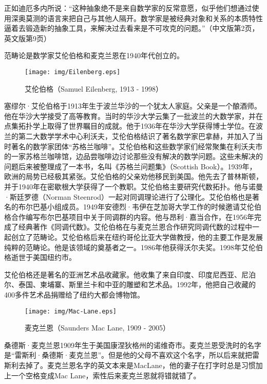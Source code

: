 \documentclass{article}
\begin{document}
正如迪厄多内所说：“这种抽象绝不是来自数学家的反常意愿，似乎他们想通过使用深奥莫测的语言来把自己与其他人隔开。数学家是被经典对象和关系的本质特性逼着去锻造新的抽象工具，来解决过去看来是不可攻克的问题。”\cite{Dieudonne1987}（中文版第2页，英文版第9页）

范畴论是数学家艾伦伯格和麦克兰恩在1940年代创立的。

\begin{wrapfigure}{R}{0.3\textwidth}
 \centering
 \texttt{[image: img/Eilenberg.eps]}
 \captionsetup{labelformat=empty}
 \caption{艾伦伯格（Samuel Eilenberg, 1913 - 1998）}
 \label{fig:Eilenberg}
\end{wrapfigure}

塞缪尔·艾伦伯格于1913年生于波兰华沙的一个犹太人家庭。父亲是一个酿酒师。他在华沙大学接受了高等教育。当时的华沙大学云集了一批波兰的大数学家，并在点集拓扑学上取得了世界瞩目的成就。他于1936年在华沙大学获得博士学位。在波兰的第二大数学学术中心利沃夫，艾伦伯格结识了著名数学家巴拿赫，并加入了当时著名的数学家团体“苏格兰咖啡”。艾伦伯格和这些数学家们经常聚集在利沃夫市的一家苏格兰咖啡馆，边品尝咖啡边讨论那些没有解决的数学问题。这些未解决的问题后来被整理成了一本书，名叫《苏格兰问题集》（Scottish Book）。1939年，欧洲的局势已经极其紧张。艾伦伯格的父亲劝他移民到美国。他先去了普林斯顿，并于1940年在密歇根大学获得了一个教职。艾伦伯格主要研究代数拓扑。他与诺曼·斯廷罗德（Norman Steenrod）一起对同调理论进行了公理化。艾伦伯格也是著名的布尔巴基小组成员。1949年安德烈·韦伊在芝加哥大学工作的时候邀请艾伦伯格合作编写布尔巴基项目中关于同调群的内容。他与昂利·嘉当合作，在1956年完成了经典著作《同调代数》。艾伦伯格在与麦克兰恩合作研究同调代数的过程中一起创立了范畴论。艾伦伯格后来在纽约哥伦比亚大学做教授，他的主要工作是发展纯粹的范畴论。他是该领域的奠基者之一。1986年他获得沃尔夫奖。1998年艾伦伯格逝世于美国纽约市。

艾伦伯格还是著名的亚洲艺术品收藏家。他收集了来自印度、印度尼西亚、尼泊尔、泰国、柬埔寨、斯里兰卡和中亚的雕塑和艺术品。1992年，他把自己收藏的400多件艺术品捐赠给了纽约大都会博物馆\cite{Wiki-Eilenberg}。

\begin{wrapfigure}{L}{0.3\textwidth}
 \centering
 \texttt{[image: img/Mac-Lane.eps]}
 \captionsetup{labelformat=empty}
 \caption{麦克兰恩（Saunders Mac Lane, 1909 - 2005）}
 \label{fig:Mac-Lane}
\end{wrapfigure}

桑德斯·麦克兰恩1909年生于美国康涅狄格州的诺维奇市。麦克兰恩受洗时的名字是“雷斯利·桑德斯·麦克兰恩”。但是他的父母不喜欢这个名字，所以后来就把雷斯利去掉了。麦克兰恩名字的英文本来是MacLane，他的妻子在打字时总是习惯加上一个空格变成Mac Lane，索性后来麦克兰恩就将错就错了。
\end{document}
